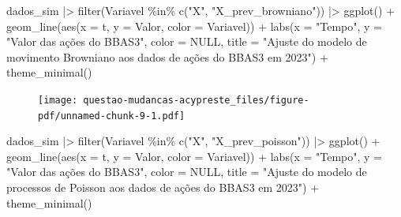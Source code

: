 \documentclass[
  letterpaper,
  DIV=11,
  numbers=noendperiod]{scrreprt}
\newenvironment{Shaded}{\begin{snugshade}}{\end{snugshade}}
\newcommand{\AttributeTok}[1]{\textcolor[rgb]{0.40,0.45,0.13}{#1}}
\newcommand{\ConstantTok}[1]{\textcolor[rgb]{0.56,0.35,0.01}{#1}}
\newcommand{\FunctionTok}[1]{\textcolor[rgb]{0.28,0.35,0.67}{#1}}
\newcommand{\NormalTok}[1]{\textcolor[rgb]{0.00,0.23,0.31}{#1}}
\newcommand{\SpecialCharTok}[1]{\textcolor[rgb]{0.37,0.37,0.37}{#1}}
\newcommand{\StringTok}[1]{\textcolor[rgb]{0.13,0.47,0.30}{#1}}
\begin{document}
\begin{Shaded}
\begin{Highlighting}[]
\NormalTok{dados\_sim }\SpecialCharTok{|\textgreater{}} 
    \FunctionTok{filter}\NormalTok{(Variavel }\SpecialCharTok{\%in\%} \FunctionTok{c}\NormalTok{(}\StringTok{"X"}\NormalTok{, }\StringTok{"X\_prev\_browniano"}\NormalTok{)) }\SpecialCharTok{|\textgreater{}} 
    \FunctionTok{ggplot}\NormalTok{() }\SpecialCharTok{+}
    \FunctionTok{geom\_line}\NormalTok{(}\FunctionTok{aes}\NormalTok{(}\AttributeTok{x =}\NormalTok{ t, }\AttributeTok{y =}\NormalTok{ Valor, }\AttributeTok{color =}\NormalTok{ Variavel)) }\SpecialCharTok{+}
    \FunctionTok{labs}\NormalTok{(}\AttributeTok{x =} \StringTok{"Tempo"}\NormalTok{,}
         \AttributeTok{y =} \StringTok{"Valor das ações do BBAS3"}\NormalTok{,}
         \AttributeTok{color =} \ConstantTok{NULL}\NormalTok{,}
         \AttributeTok{title =} \StringTok{"Ajuste do modelo de movimento Browniano}
\StringTok{          aos dados de ações do BBAS3 em 2023"}\NormalTok{) }\SpecialCharTok{+}
    \FunctionTok{theme\_minimal}\NormalTok{()}
\end{Highlighting}
\end{Shaded}

\begin{figure}[H]

{\centering \texttt{[image: questao-mudancas-acypreste\_files/figure-pdf/unnamed-chunk-9-1.pdf]}

}

\end{figure}

\begin{Shaded}
\begin{Highlighting}[]
\NormalTok{dados\_sim }\SpecialCharTok{|\textgreater{}}
    \FunctionTok{filter}\NormalTok{(Variavel }\SpecialCharTok{\%in\%} \FunctionTok{c}\NormalTok{(}\StringTok{"X"}\NormalTok{, }\StringTok{"X\_prev\_poisson"}\NormalTok{)) }\SpecialCharTok{|\textgreater{}}
    \FunctionTok{ggplot}\NormalTok{() }\SpecialCharTok{+}
    \FunctionTok{geom\_line}\NormalTok{(}\FunctionTok{aes}\NormalTok{(}\AttributeTok{x =}\NormalTok{ t, }\AttributeTok{y =}\NormalTok{ Valor, }\AttributeTok{color =}\NormalTok{ Variavel)) }\SpecialCharTok{+}
    \FunctionTok{labs}\NormalTok{(}\AttributeTok{x =} \StringTok{"Tempo"}\NormalTok{,}
         \AttributeTok{y =} \StringTok{"Valor das ações do BBAS3"}\NormalTok{,}
         \AttributeTok{color =} \ConstantTok{NULL}\NormalTok{,}
         \AttributeTok{title =} \StringTok{"Ajuste do modelo de processos de Poisson}
\StringTok{          aos dados de ações do BBAS3 em 2023"}\NormalTok{) }\SpecialCharTok{+}
    \FunctionTok{theme\_minimal}\NormalTok{()}
\end{Highlighting}
\end{Shaded}
\end{document}
